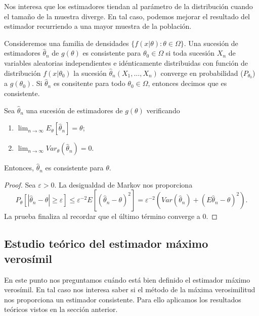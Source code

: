 \documentclass{article}
\begin{document}
    Nos interesa que los estimadores tiendan al parámetro de la distribución cuando el tamaño de la muestra diverge. En tal caso, podemos mejorar el resultado del estimador recurriendo a una mayor muestra de la población.

    \begin{definition}
        Consideremos una familia de densidades $\{f(x | \theta) : \theta \in \Omega\}$. Una sucesión de estimadores $\hat\theta_n$ de $g(\theta)$ es consistente para $\theta_0 \in \Omega$ si toda sucesión $X_n$ de variables aleatorias independientes e idénticamente distribuidas con función de distribución $f(x | \theta_0)$ la sucesión $\hat\theta_n(X_1, \ldots, X_n)$ converge en probabilidad ($P_{\theta_0}$) a $g(\theta_0)$. Si $\hat\theta_n$ es consitente para todo $\theta_0 \in \Omega$, entonces decimos que es consistente.
    \end{definition}

    \begin{thm}
        Sea $\hat\theta_n$ una sucesión de estimadores de $g(\theta)$ verificando
        \begin{enumerate}
            \item $\lim_{n \to \infty} E_\theta[\hat\theta_n] = \theta$;
            \item $\lim_{n \to \infty} Var_\theta(\hat\theta_n) = 0$.
        \end{enumerate}
        Entonces, $\hat\theta_n$ es consistente para $\theta$.
    \end{thm}
    \begin{proof}
        Sea $\varepsilon > 0$. La desigualdad de Markov nos proporciona
        \[P_\theta[|\hat\theta_n - \theta| \ge \varepsilon] \le \varepsilon^{-2} E[(\hat\theta_n - \theta)^2] = \varepsilon^{-2}  \left(Var(\hat\theta_n) + (E\hat\theta_n -\theta)^2\right).\]
        La prueba finaliza al recordar que el último término converge a $0$.
    \end{proof}

    \subsection{Estudio teórico del estimador máximo verosímil}

    En este punto nos preguntamos cuándo está bien definido el estimador máximo verosímil. En tal caso nos interesa saber si el método de la máxima verosimilitud nos proporciona un estimador consistente. Para ello aplicamos los resultados teóricos vistos en la sección anterior.
\end{document}
